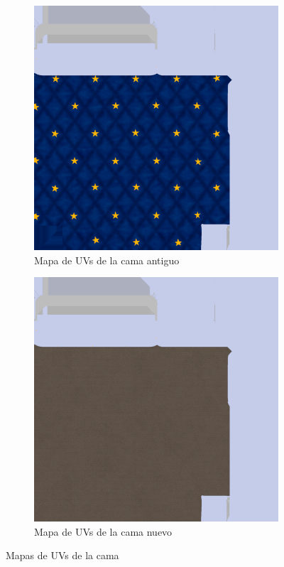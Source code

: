 \documentclass[12pt, a4paper,twoside,titlepage]{book}
\begin{document}
\begin{figure}
	\centering
	\begin{subfigure}{.5\textwidth}
		\centering
		\includegraphics[width=.95\linewidth]{TGF/Artes/TexBed.png}
		\caption{Mapa de UVs de la cama antiguo}
	\end{subfigure}%
	\begin{subfigure}{.5\textwidth}
		\centering
		\includegraphics[width=.95\linewidth]{TGF/Artes/TexBed2.png}
		\caption{Mapa de UVs de la cama nuevo}
	\end{subfigure}
	\caption{Mapas de UVs de la cama}
	\label{fig:texBed}
\end{figure}
\end{document}
